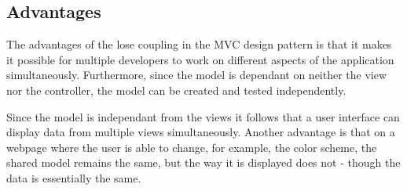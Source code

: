 \subsection{Advantages}

The advantages of the lose coupling in the MVC design pattern is that it makes it possible for 
multiple developers to work on different aspects of the application simultaneously. 
Furthermore, since the model is dependant on neither the view nor the controller, the model 
can be created and tested independently\cite{modelviewcontroller}.

Since the model is independant from the views it follows that a user interface can display data from multiple 
views simultaneously. Another advantage is that on a webpage where the user is able to change, for example, the 
color scheme, the shared model remains the same, but the way it is displayed does not - though the data is 
essentially the same\cite{modelviewcontroller}.